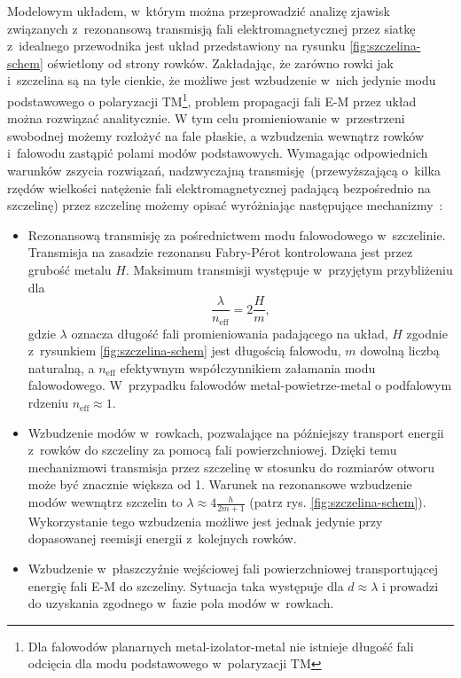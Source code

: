 Modelowym układem, w~którym można przeprowadzić analizę zjawisk związanych z~rezonansową transmisją fali elektromagnetycznej przez siatkę z~idealnego przewodnika jest układ przedstawiony na rysunku \ref{fig:szczelina-schem} oświetlony od strony rowków. Zakładając, że zarówno rowki jak i~szczelina są na tyle cienkie, że możliwe jest wzbudzenie w~nich jedynie modu podstawowego o polaryzacji TM\footnote{Dla falowodów planarnych metal-izolator-metal nie istnieje długość fali odcięcia dla modu podstawowego w~polaryzacji TM}, problem propagacji fali E-M przez układ można rozwiązać analitycznie. W tym celu promieniowanie w~przestrzeni swobodnej możemy rozłożyć na fale płaskie, a wzbudzenia wewnątrz rowków i~falowodu zastąpić polami modów podstawowych. Wymagając odpowiednich warunków zszycia rozwiązań, nadzwyczajną transmisję~(przewyższającą o~kilka rzędów wielkości natężenie fali elektromagnetycznej padającą bezpośrednio na szczelinę) przez szczelinę możemy opisać wyróżniając następujące mechanizmy~\cite{martin2001theory}:
\begin{itemize}
	\item Rezonansową transmisję za pośrednictwem modu falowodowego w~szczelinie. Transmisja na zasadzie rezonansu Fabry-P\'{e}rot kontrolowana jest przez grubość metalu $H$. Maksimum transmisji występuje w~przyjętym przybliżeniu dla
\begin{equation}
\frac{\lambda}{n_{\textrm{eff}}} = 2 \frac {H}{m},
\label{eq:fp-szczelina}
\end{equation}
gdzie $\lambda$ oznacza długość fali promieniowania padającego na układ, $H$ zgodnie z~rysunkiem \ref{fig:szczelina-schem} jest długością falowodu, $m$ dowolną liczbą naturalną, a $n_{\textrm{eff}}$ efektywnym współczynnikiem załamania modu falowodowego. W~przypadku falowodów metal-powietrze-metal o podfalowym rdzeniu $n_{\textrm{eff}} \approx 1$.
	\item Wzbudzenie modów w~rowkach, pozwalające na późniejszy transport energii z~rowków do szczeliny za pomocą fali powierzchniowej. Dzięki temu mechanizmowi transmisja przez szczelinę w stosunku do rozmiarów otworu może być znacznie większa od 1. Warunek na rezonansowe wzbudzenie modów wewnątrz szczelin to $\lambda \approx 4 \frac {h}{2m+1}$ (patrz rys. \ref{fig:szczelina-schem}). Wykorzystanie tego wzbudzenia możliwe jest jednak jedynie przy dopasowanej reemisji energii z~kolejnych rowków.
	\item  Wzbudzenie w~płaszczyźnie wejściowej fali powierzchniowej transportującej energię fali E-M do szczeliny. Sytuacja taka występuje dla $d \approx \lambda$ i prowadzi do uzyskania zgodnego w~fazie pola modów w~rowkach.
\end{itemize}

